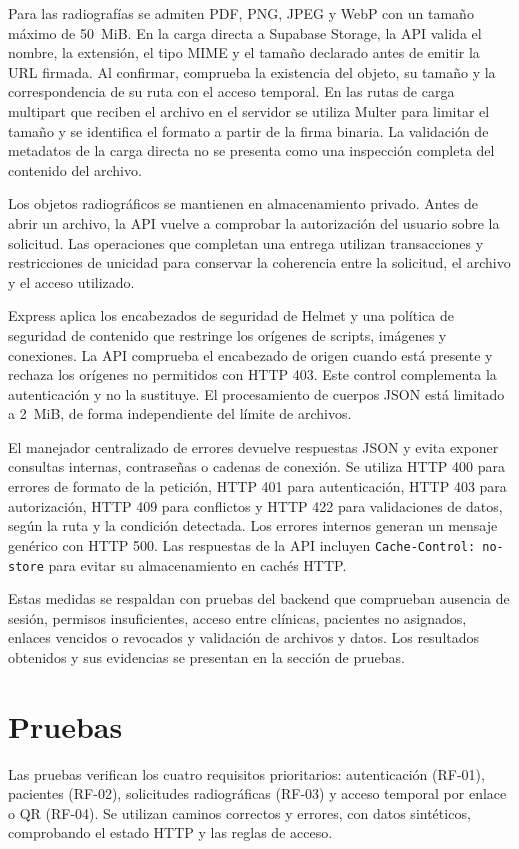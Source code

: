 \documentclass[12pt,letterpaper]{report}
\begin{document}
Para las radiografías se admiten PDF, PNG, JPEG y WebP con un tamaño máximo
de \mbox{50 MiB}. En la carga directa a Supabase Storage, la API valida el
nombre, la extensión, el tipo MIME y el tamaño declarado antes de emitir
la URL firmada. Al confirmar, comprueba la existencia del objeto, su tamaño
y la correspondencia de su ruta con el acceso temporal. En las rutas de
carga multipart que reciben el archivo en el servidor se utiliza Multer
para limitar el tamaño y se identifica el formato a partir de la firma
binaria. La validación de metadatos de la carga directa no se presenta como
una inspección completa del contenido del archivo.

Los objetos radiográficos se mantienen en almacenamiento privado. Antes
de abrir un archivo, la API vuelve a comprobar la autorización del usuario
sobre la solicitud. Las operaciones que completan una entrega utilizan
transacciones y restricciones de unicidad para conservar la coherencia
entre la solicitud, el archivo y el acceso utilizado.

Express aplica los encabezados de seguridad de Helmet y una política de
seguridad de contenido que restringe los orígenes de scripts, imágenes y
conexiones. La API comprueba el encabezado de origen cuando está presente
y rechaza los orígenes no permitidos con HTTP 403. Este control complementa
la autenticación y no la sustituye. El procesamiento de cuerpos JSON está
limitado a \mbox{2 MiB}, de forma independiente del límite de archivos.

El manejador centralizado de errores devuelve respuestas JSON y evita
exponer consultas internas, contraseñas o cadenas de conexión. Se utiliza
HTTP 400 para errores de formato de la petición, HTTP 401 para autenticación,
HTTP 403 para autorización, HTTP 409 para conflictos y HTTP 422 para
validaciones de datos, según la ruta y la condición detectada. Los errores
internos generan un mensaje genérico con HTTP 500. Las respuestas de la
API incluyen \texttt{Cache-Control: no-store} para evitar su almacenamiento
en cachés HTTP.

Estas medidas se respaldan con pruebas del backend que comprueban ausencia
de sesión, permisos insuficientes, acceso entre clínicas, pacientes no
asignados, enlaces vencidos o revocados y validación de archivos y datos.
Los resultados obtenidos y sus evidencias se presentan en la sección de pruebas.

\section{Pruebas}
Las pruebas verifican los cuatro requisitos prioritarios: autenticación
(RF-01), pacientes (RF-02), solicitudes radiográficas (RF-03) y acceso
temporal por enlace o QR (RF-04). Se utilizan caminos correctos y errores,
con datos sintéticos, comprobando el estado HTTP y las reglas de acceso.
\end{document}
